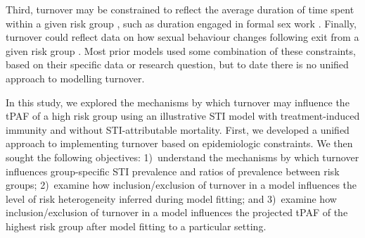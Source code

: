 Third, turnover may be constrained to reflect the average duration of time spent 
within a given risk group \citep{Boily2015},
such as duration engaged in formal sex work \citep{Watts2010}.
Finally, turnover could reflect data on how sexual behaviour changes
following exit from a given risk group \citep{Boily2015}.
Most prior models used some combination of these constraints,
based on their specific data or research question,
but to date there is no unified approach to modelling turnover.
\par
In this study, we explored the mechanisms by which turnover
may influence the tPAF of a high risk group
using an illustrative STI model
with treatment-induced immunity and without STI-attributable mortality.
First, we developed a unified approach to
implementing turnover based on epidemiologic constraints.
We then sought the following objectives:
1)~understand the mechanisms by which turnover
influences group-specific STI prevalence and ratios of prevalence between risk groups;
2)~examine how inclusion/exclusion of turnover in a model influences
the level of risk heterogeneity inferred during model fitting; and
3)~examine how inclusion/exclusion of turnover in a model influences
the projected tPAF of the highest risk group
after model fitting to a particular setting.
